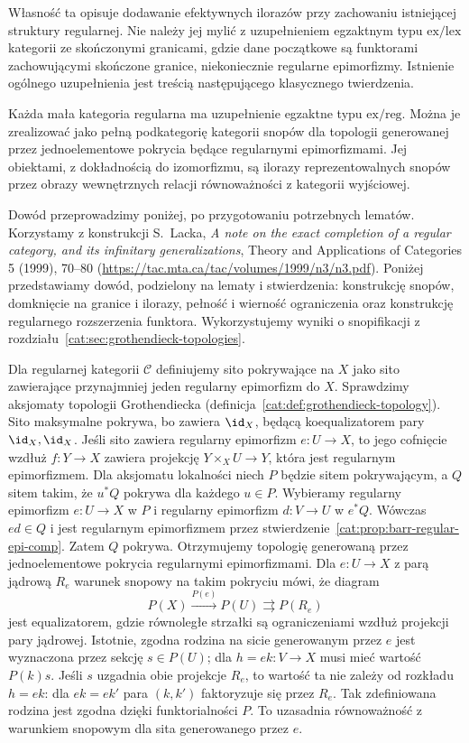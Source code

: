 Własność ta opisuje dodawanie efektywnych ilorazów przy zachowaniu istniejącej struktury regularnej. Nie należy jej mylić z uzupełnieniem egzaktnym typu $\mathrm{ex/lex}$ kategorii ze skończonymi granicami, gdzie dane początkowe są funktorami zachowującymi skończone granice, niekoniecznie regularne epimorfizmy. Istnienie ogólnego uzupełnienia jest treścią następującego klasycznego twierdzenia.

\begin{twierdzenie}\label{cat:thm:barr-exact-completion-exists}
Każda mała kategoria regularna ma uzupełnienie egzaktne typu $\mathrm{ex/reg}$. Można je zrealizować jako pełną podkategorię kategorii snopów dla topologii generowanej przez jednoelementowe pokrycia będące regularnymi epimorfizmami. Jej obiektami, z dokładnością do izomorfizmu, są ilorazy reprezentowalnych snopów przez obrazy wewnętrznych relacji równoważności z kategorii wyjściowej.
\end{twierdzenie}

Dowód przeprowadzimy poniżej, po przygotowaniu potrzebnych lematów. Korzystamy z konstrukcji S.~Lacka, \emph{A note on the exact completion of a regular category, and its infinitary generalizations}, Theory and Applications of Categories 5 (1999), 70--80 (\url{https://tac.mta.ca/tac/volumes/1999/n3/n3.pdf}). Poniżej przedstawiamy dowód, podzielony na lematy i stwierdzenia: konstrukcję snopów, domknięcie na granice i ilorazy, pełność i wierność ograniczenia oraz konstrukcję regularnego rozszerzenia funktora. Wykorzystujemy wyniki o snopifikacji z rozdziału~\ref{cat:sec:grothendieck-topologies}.

Dla regularnej kategorii $\mathcal C$ definiujemy sito pokrywające na $X$ jako sito zawierające przynajmniej jeden regularny epimorfizm do $X$. Sprawdzimy aksjomaty topologii Grothendiecka (definicja~\ref{cat:def:grothendieck-topology}). Sito maksymalne pokrywa, bo zawiera $\id_X$, będącą koequalizatorem pary $\id_X,\id_X$. Jeśli sito zawiera regularny epimorfizm $e:U\to X$, to jego cofnięcie wzdłuż $f:Y\to X$ zawiera projekcję $Y\times_X U\to Y$, która jest regularnym epimorfizmem. Dla aksjomatu lokalności niech $P$ będzie sitem pokrywającym, a $Q$ sitem takim, że $u^*Q$ pokrywa dla każdego $u\in P$. Wybieramy regularny epimorfizm $e:U\to X$ w $P$ i regularny epimorfizm $d:V\to U$ w $e^*Q$. Wówczas $ed\in Q$ i jest regularnym epimorfizmem przez stwierdzenie~\ref{cat:prop:barr-regular-epi-comp}. Zatem $Q$ pokrywa. Otrzymujemy topologię generowaną przez jednoelementowe pokrycia regularnymi epimorfizmami. Dla $e:U\to X$ z parą jądrową $R_e$ warunek snopowy na takim pokryciu mówi, że diagram
\[
 P(X)\xrightarrow{P(e)}P(U)\rightrightarrows P(R_e)
\]
jest equalizatorem, gdzie równoległe strzałki są ograniczeniami wzdłuż projekcji pary jądrowej. Istotnie, zgodna rodzina na sicie generowanym przez $e$ jest wyznaczona przez sekcję $s\in P(U)$; dla $h=ek:V\to X$ musi mieć wartość $P(k)s$. Jeśli $s$ uzgadnia obie projekcje $R_e$, to wartość ta nie zależy od rozkładu $h=ek$: dla $ek=ek'$ para $(k,k')$ faktoryzuje się przez $R_e$. Tak zdefiniowana rodzina jest zgodna dzięki funktorialności $P$. To uzasadnia równoważność z warunkiem snopowym dla sita generowanego przez $e$.

